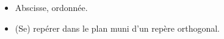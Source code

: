 \begin{prerequis}    
    \begin{itemize}        
        \item[\emoji{red-heart}] Abscisse, ordonnée.
        \item[\emoji{diamond-suit}] (Se) repérer dans le plan muni d'un repère orthogonal.
    \end{itemize}
\end{prerequis}